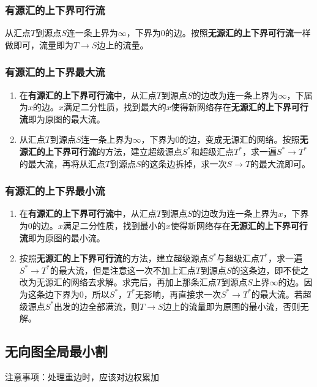 \documentclass[landscape,a4paper]{article}
\begin{document}
\begin{spacing}{0.3}
\begin{multicols}{2}
\subsubsection{有源汇的上下界可行流}

从汇点$T$到源点$S$连一条上界为$\infty$，下界为$0$的边。按照\textbf{无源汇的上下界可行流}一样做即可，流量即为$T \rightarrow S$边上的流量。

\subsubsection{有源汇的上下界最大流}

\begin{enumerate}
	\item 在\textbf{有源汇的上下界可行流}中，从汇点$T$到源点$S$的边改为连一条上界为$\infty$，下届为$x$的边。$x$满足二分性质，找到最大的$x$使得新网络存在\textbf{无源汇的上下界可行流}即为原图的最大流。
	\item 从汇点$T$到源点$S$连一条上界为$\infty$，下界为$0$的边，变成无源汇的网络。按照\textbf{无源汇的上下界可行流}的方法，建立超级源点$S^*$和超级汇点$T^*$，求一遍$S^* \rightarrow T^*$的最大流，再将从汇点$T$到源点$S$的这条边拆掉，求一次$S \rightarrow T$的最大流即可。
\end{enumerate}

\subsubsection{有源汇的上下界最小流}

\begin{enumerate}
	\item 在\textbf{有源汇的上下界可行流}中，从汇点$T$到源点$S$的边改为连一条上界为$x$，下界为$0$的边。$x$满足二分性质，找到最小的$x$使得新网络存在\textbf{无源汇的上下界可行流}即为原图的最小流。
	\item 按照\textbf{无源汇的上下界可行流}的方法，建立超级源点$S^*$与超级汇点$T^*$，求一遍$S^* \rightarrow T^*$的最大流，但是注意这一次不加上汇点$T$到源点$S$的这条边，即不使之改为无源汇的网络去求解。求完后，再加上那条汇点$T$到源点$S$上界$\infty$的边。因为这条边下界为$0$，所以$S^*$，$T^*$无影响，再直接求一次$S^* \rightarrow T^*$的最大流。若超级源点$S^*$出发的边全部满流，则$T \rightarrow S$边上的流量即为原图的最小流，否则无解。
\end{enumerate}

	\subsection{无向图全局最小割}
	注意事项：处理重边时，应该对边权累加
	

\end{multicols}
\end{spacing}
\end{document}
